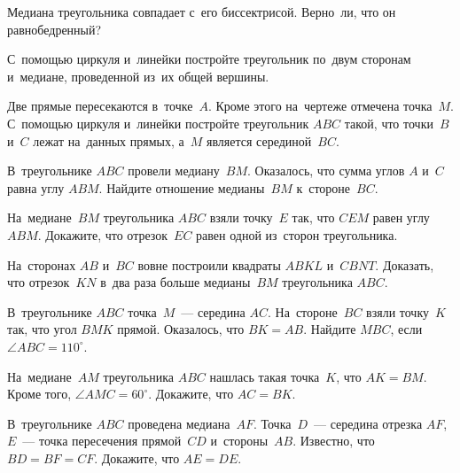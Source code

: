 


\begin{problems}

\item
Медиана треугольника совпадает с~его биссектрисой.
Верно~ли, что он равнобедренный?

\item
С~помощью циркуля и~линейки постройте треугольник по~двум сторонам и~медиане,
проведенной из~их общей вершины.

\item
Две прямые пересекаются в~точке~$A$.
Кроме этого на~чертеже отмечена точка~$M$.
С~помощью циркуля и~линейки постройте треугольник $ABC$ такой, что точки~$B$
и~$C$ лежат на~данных прямых, а~$M$ является серединой~$BC$.

\item
В~треугольнике $ABC$ провели медиану~$BM$.
Оказалось, что сумма углов $A$ и~$C$ равна углу $ABM$.
Найдите отношение медианы~$BM$ к~стороне~$BC$.

\item
На~медиане~$BM$ треугольника $ABC$ взяли точку~$E$ так, что $CEM$ равен
углу $ABM$.
Докажите, что отрезок~$EC$ равен одной из~сторон треугольника.

\item
На~сторонах $AB$ и~$BC$ вовне построили квадраты $ABKL$ и~$CBNT$.
Доказать, что отрезок~$KN$ в~два раза больше медианы~$BM$ треугольника $ABC$.

\item
В~треугольнике $ABC$ точка~$M$~--- середина $AC$.
На~стороне~$BC$ взяли точку~$K$ так, что угол $BMK$ прямой.
Оказалось, что $BK = AB$.
Найдите $MBC$, если $\angle ABC =110^{\circ}$.


\item
На~медиане~$AM$ треугольника $ABC$ нашлась такая точка~$K$, что $AK = BM$.
Кроме того, $\angle AMC = 60^{\circ}$.
Докажите, что $AC = BK$.

\item
В~треугольнике $ABC$ проведена медиана~$AF$.
Точка~$D$~--- середина отрезка $AF$, $E$~--- точка пересечения прямой~$CD$
и~стороны~$AB$.
Известно, что $BD = BF = CF$.
Докажите, что $AE = DE$.

\end{problems}

